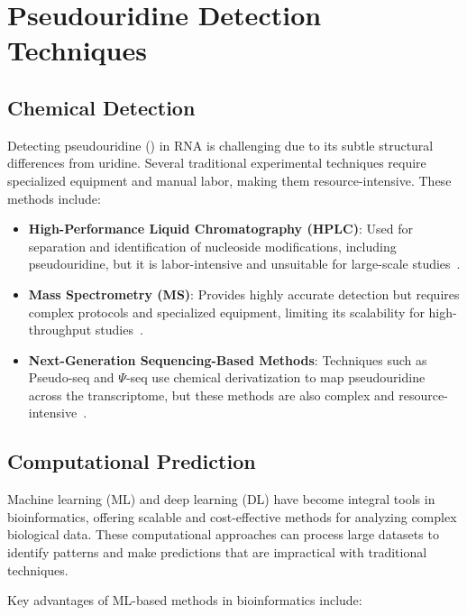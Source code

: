\section{Pseudouridine Detection Techniques}\label{sec:pseudouridine-detection-techniques}
  \subsection*{Chemical Detection}

    Detecting pseudouridine (\pseudo) in RNA is challenging due to its subtle structural differences from uridine.
    Several traditional experimental techniques require specialized equipment and manual labor, making them resource-intensive.
    These methods include:

    \begin{itemize}
      \item \textbf{High-Performance Liquid Chromatography (HPLC)}: Used for separation and identification of nucleoside modifications, including pseudouridine, but it is labor-intensive and unsuitable for large-scale studies~\cite{gehrke_quantitative_1982}.
      \item \textbf{Mass Spectrometry (MS)}: Provides highly accurate detection but requires complex protocols and specialized equipment, limiting its scalability for high-throughput studies~\cite{de_hoffmann_mass_2011}.
      \item \textbf{Next-Generation Sequencing-Based Methods}: Techniques such as Pseudo-seq and $\Psi$-seq use chemical derivatization to map pseudouridine across the transcriptome, but these methods are also complex and resource-intensive~\cite{carlile_pseudo-seq_2015}.
    \end{itemize}

  \subsection*{Computational Prediction}
    Machine learning (ML) and deep learning (DL) have become integral tools in bioinformatics, offering scalable and cost-effective methods for analyzing complex biological data.
    These computational approaches can process large datasets to identify patterns and make predictions that are impractical with traditional techniques.

    Key advantages of ML-based methods in bioinformatics include:

